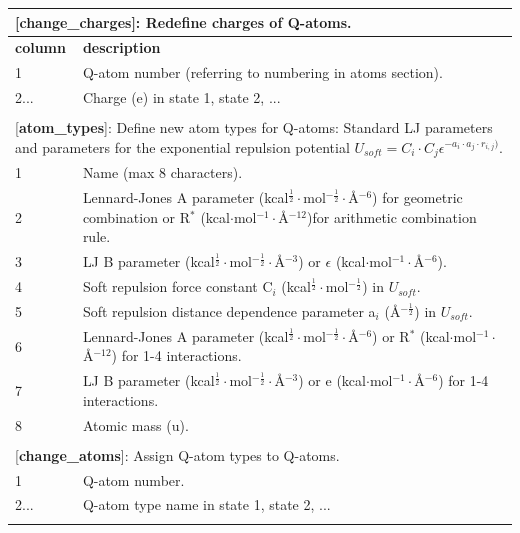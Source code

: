 \documentclass[a4paper,12pt]{article}
\begin{document}
\begin{longtable}{|p{53pt}|p{181pt}|p{160pt}|}
\multicolumn{3}{p{394pt}}{[\textbf{change\_charges}]: Redefine charges of Q-atoms.}\\
\hline \textbf{column} & \multicolumn{2}{p{341pt}|}{\textbf{description}}\\
\hline 1 & \multicolumn{2}{p{341pt}|}{Q-atom number (referring to numbering in atoms section).}\\
\hline 2... & \multicolumn{2}{p{341pt}|}{Charge (e) in state 1, state 2, ...}\\
\hline
\multicolumn{3}{p{394pt}}{}\\

\multicolumn{3}{p{394pt}}{[\textbf{atom\_types}]: Define new atom types for Q-atoms: Standard LJ parameters and parameters for the exponential repulsion potential $U_{soft} = C_i\cdot C_j\epsilon^{-a_i\cdot a_j\cdot r_{i,j})}$.}\\
\hline 1 & \multicolumn{2}{p{341pt}|}{Name (max 8 characters).}\\
\hline 2 & \multicolumn{2}{p{341pt}|}{Lennard-Jones A parameter (kcal$^{\frac{1}{2}}\cdot$mol$^{-\frac{1}{2}}\cdot${\AA}$^{-6}$) for geometric combination or R$^*$ (kcal$\cdot$mol$^{-1}\cdot${\AA}$^{-12}$)for arithmetic combination rule.}\\
\hline 3 & \multicolumn{2}{p{341pt}|}{LJ B parameter (kcal$^{\frac{1}{2}}\cdot$mol$^{-\frac{1}{2}}\cdot${\AA}$^{-3}$) or $\epsilon$ (kcal$\cdot$mol$^{-1}\cdot${\AA}$^{-6}$).}\\
\hline 4 & \multicolumn{2}{p{341pt}|}{Soft repulsion force constant C$_i$ (kcal$^{\frac{1}{2}}\cdot$mol$^{-\frac{1}{2}}$) in $U_{soft}$.}\\
\hline 5 & \multicolumn{2}{p{341pt}|}{Soft repulsion distance dependence parameter a$_i$ ({\AA}$^{-\frac{1}{2}}$) in $U_{soft}$.}\\
\hline 6 & \multicolumn{2}{p{341pt}|}{Lennard-Jones A parameter (kcal$^{\frac{1}{2}}\cdot$mol$^{-\frac{1}{2}}\cdot${\AA}$^{-6}$) or R$^*$ (kcal$\cdot$mol$^{-1}\cdot${\AA}$^{-12}$) for 1-4 interactions.}\\
\hline 7 & \multicolumn{2}{p{341pt}|}{LJ B parameter (kcal$^{\frac{1}{2}}\cdot$mol$^{-\frac{1}{2}}\cdot${\AA}$^{-3}$) or e (kcal$\cdot$mol$^{-1}\cdot${\AA}$^{-6}$) for 1-4 interactions.}\\
\hline 8 & \multicolumn{2}{p{341pt}|}{Atomic mass (u).}\\
\hline
\multicolumn{3}{p{394pt}}{}\\

\multicolumn{3}{p{394pt}}{[\textbf{change\_atoms}]: Assign Q-atom types to Q-atoms.}\\
\hline 1 & \multicolumn{2}{p{341pt}|}{Q-atom number.}\\
\hline 2... & \multicolumn{2}{p{341pt}|}{Q-atom type name in state 1, state 2, ...}\\
\hline
\multicolumn{3}{p{394pt}}{}\\


\end{longtable}
\end{document}
